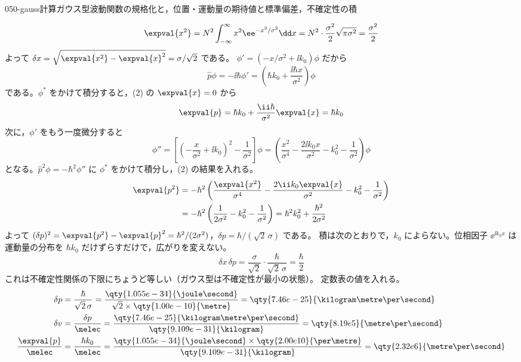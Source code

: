 \documentclass[uplatex,dvipdfmx,a4paper,11pt]{jsarticle}
\begin{document}
\begin{mondai}{050-gauss}{計算}{ガウス型波動関数の規格化と，位置・運動量の期待値と標準偏差，不確定性の積}
\begin{tadashii}
\[ \expval{x^{2}}=N^{2}\int_{-\infty}^{\infty}x^{2}\ee^{-x^{2}/\sigma^{2}}\dd x=N^{2}\cdot\frac{\sigma^{2}}{2}\sqrt{\pi\sigma^{2}}=\frac{\sigma^{2}}{2} \]
よって $\delta x=\sqrt{\expval{x^{2}}-\expval{x}^{2}}=\sigma/\sqrt{2}$ である。
 $\phi'=(-x/\sigma^{2}+\ii k_{0})\phi$ だから
\[ \hat{p}\phi=-\ii\hbar\phi'=\left(\hbar k_{0}+\frac{\ii\hbar x}{\sigma^{2}}\right)\phi \]
である。$\phi^{*}$ をかけて積分すると，(2) の $\expval{x}=0$ から
\[ \expval{p}=\hbar k_{0}+\frac{\ii\hbar}{\sigma^{2}}\expval{x}=\hbar k_{0} \]
次に，$\phi'$ をもう一度微分すると
\[ \phi''=\left[\left(-\frac{x}{\sigma^{2}}+\ii k_{0}\right)^{2}-\frac{1}{\sigma^{2}}\right]\phi=\left(\frac{x^{2}}{\sigma^{4}}-\frac{2\ii k_{0}x}{\sigma^{2}}-k_{0}^{2}-\frac{1}{\sigma^{2}}\right)\phi \]
となる。$\hat{p}^{2}\phi=-\hbar^{2}\phi''$ に $\phi^{*}$ をかけて積分し，(2) の結果を入れる。
\begin{align*}
\expval{p^{2}}&=-\hbar^{2}\left(\frac{\expval{x^{2}}}{\sigma^{4}}-\frac{2\ii k_{0}\expval{x}}{\sigma^{2}}-k_{0}^{2}-\frac{1}{\sigma^{2}}\right)\\
&=-\hbar^{2}\left(\frac{1}{2\sigma^{2}}-k_{0}^{2}-\frac{1}{\sigma^{2}}\right)=\hbar^{2}k_{0}^{2}+\frac{\hbar^{2}}{2\sigma^{2}}
\end{align*}
よって $(\delta p)^{2}=\expval{p^{2}}-\expval{p}^{2}=\hbar^{2}/(2\sigma^{2})$，$\delta p=\hbar/(\sqrt{2}\,\sigma)$ である。
 積は次のとおりで，$k_{0}$ によらない。位相因子 $\ee^{\ii k_{0}x}$ は運動量の分布を $\hbar k_{0}$ だけずらすだけで，広がりを変えない。
\[ \delta x\,\delta p=\frac{\sigma}{\sqrt{2}}\cdot\frac{\hbar}{\sqrt{2}\,\sigma}=\frac{\hbar}{2} \]
これは不確定性関係の下限にちょうど等しい（ガウス型は不確定性が最小の状態）。
 定数表の値を入れる。
\begin{align*}
\delta p&=\frac{\hbar}{\sqrt{2}\,\sigma}=\frac{\qty{1.055e-34}{\joule\second}}{\sqrt{2}\times\qty{1.00e-10}{\metre}}=\qty{7.46e-25}{\kilogram\metre\per\second}\\
\delta v&=\frac{\delta p}{\melec}=\frac{\qty{7.46e-25}{\kilogram\metre\per\second}}{\qty{9.109e-31}{\kilogram}}=\qty{8.19e5}{\metre\per\second}\\
\frac{\expval{p}}{\melec}&=\frac{\hbar k_{0}}{\melec}=\frac{\qty{1.055e-34}{\joule\second}\times\qty{2.00e10}{\per\metre}}{\qty{9.109e-31}{\kilogram}}=\qty{2.32e6}{\metre\per\second}
\end{align*}

\end{tadashii}
\end{mondai}
\end{document}
